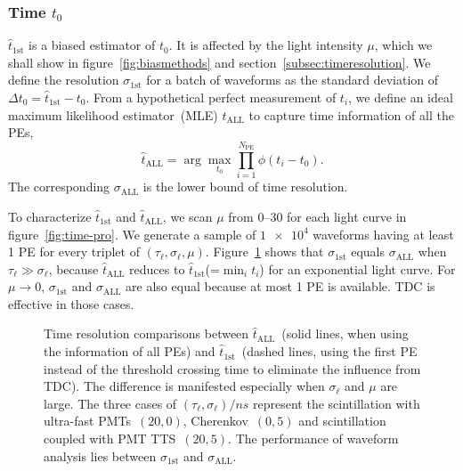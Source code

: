 \subsubsection{Time $t_0$}
\label{sec:time-shift-t_0}

$\hat{t}_\mathrm{1st}$ is a biased estimator of $t_0$.  It is affected by the light intensity $\mu$, which we shall show in figure~\ref{fig:biasmethods} and section~\ref{subsec:timeresolution}. We define the resolution $\sigma_\mathrm{1st}$ for a batch of waveforms as the standard deviation of $\Delta t_0 = \hat{t}_\mathrm{1st} - t_0$. From a hypothetical perfect measurement of $t_i$, we define an ideal maximum likelihood estimator~(MLE) $\hat{t}_\mathrm{ALL}$ to capture time information of all the PEs,
\begin{equation}
  \label{eq:2}
  \hat{t}_\mathrm{ALL} = \arg\underset{t_0}{\max} \prod_{i=1}^{N_\mathrm{PE}} \phi(t_i-t_0).
\end{equation}
The corresponding $\sigma_\mathrm{ALL}$ is the lower bound of time resolution. 

To characterize $\hat{t}_\mathrm{1st}$ and $\hat{t}_\mathrm{ALL}$, we scan $\mu$ from \numrange{0}{30} for each light curve in figure~\ref{fig:time-pro}. We generate a sample of $\num[retain-unity-mantissa=false]{1e4}$ waveforms having at least 1 PE for every triplet of $(\tau_\ell, \sigma_\ell, \mu)$.  Figure~\ref{fig:reso-diff} shows that $\sigma_{\mathrm{1st}}$ equals $\sigma_{\mathrm{ALL}}$ when $\tau_\ell \gg \sigma_\ell$, because $\hat{t}_\mathrm{ALL}$ reduces to $\hat{t}_\mathrm{1st}$(=$\min_i t_i$) for an exponential light curve. For $\mu \to 0$, $\sigma_{\mathrm{1st}}$ and $\sigma_{\mathrm{ALL}}$ are also equal because at most 1 PE is available.  TDC is effective in those cases.

\begin{figure}[H]
  \centering
  \resizebox{1.0\textwidth}{!}{}
  \caption{\label{fig:reso-diff} Time resolution comparisons between $\hat{t}_{\mathrm{ALL}}$~(solid lines, when using the information of all PEs) and $\hat{t}_\mathrm{1st}$~(dashed lines, using the first PE instead of the threshold crossing time to eliminate the influence from TDC).  The difference is manifested especially when $\sigma_\ell$ and $\mu$ are large. The three cases of $(\tau_\ell, \sigma_\ell)/\si{ns}$ represent the scintillation with ultra-fast PMTs~$(20, 0)$, Cherenkov~$(0, 5)$ and scintillation coupled with PMT TTS~$(20, 5)$. The performance of waveform analysis lies between $\sigma_{\mathrm{1st}}$ and $\sigma_{\mathrm{ALL}}$. }
\end{figure}

